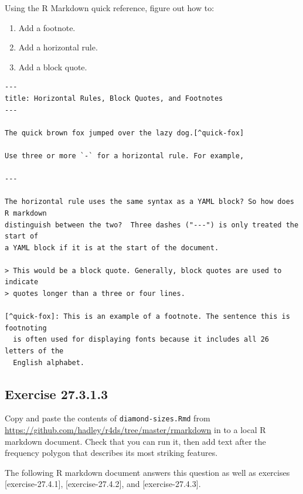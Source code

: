 \documentclass[]{book}
\providecommand{\tightlist}{%
  \setlength{\itemsep}{0pt}\setlength{\parskip}{0pt}}
\theoremstyle{plain}
\theoremstyle{remark}
\begin{document}
Using the R Markdown quick reference, figure out how to:

\begin{enumerate}
\def\labelenumi{\arabic{enumi}.}
\tightlist
\item
  Add a footnote.
\item
  Add a horizontal rule.
\item
  Add a block quote.
\end{enumerate}

\begin{verbatim}
---
title: Horizontal Rules, Block Quotes, and Footnotes
---

The quick brown fox jumped over the lazy dog.[^quick-fox]

Use three or more `-` for a horizontal rule. For example,

---

The horizontal rule uses the same syntax as a YAML block? So how does R markdown
distinguish between the two?  Three dashes ("---") is only treated the start of
a YAML block if it is at the start of the document.

> This would be a block quote. Generally, block quotes are used to indicate
> quotes longer than a three or four lines.

[^quick-fox]: This is an example of a footnote. The sentence this is footnoting
  is often used for displaying fonts because it includes all 26 letters of the
  English alphabet.
\end{verbatim}

\hypertarget{exercise-27.3.1.3}{%
\subsection*{\texorpdfstring{Exercise {27.3.1.3}}{Exercise 27.3.1.3}}\label{exercise-27.3.1.3}}

Copy and paste the contents of \texttt{diamond-sizes.Rmd} from \url{https://github.com/hadley/r4ds/tree/master/rmarkdown} in to a local R markdown document. Check that you can run it, then add text after the frequency polygon that describes its most striking features.

The following R markdown document answers this question as well as exercises {[}exercise-27.4.1{]}, {[}exercise-27.4.2{]}, and {[}exercise-27.4.3{]}.
\end{document}
